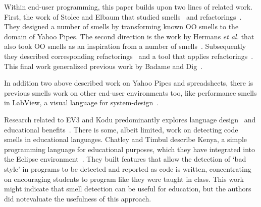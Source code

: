 \documentclass{sig-alternate}
\begin{document}
Within end-user programming, this paper builds upon two lines of related work. First, the work of Stolee and Elbaum that studied smells~\cite{StoleeTSE2013} and refactorings~\cite{Stolee2011}. They designed a number of smells by transforming known OO smells to the domain of Yahoo Pipes. The second direction is the work by Hermans \emph{et al.} that also took OO smells as an inspiration from a number of smells~\cite{Hermans2012intra, Hermans2012inter}. Subsequently they described corresponding refactorings~\cite{Hermans2012intraExt} and a tool that applies refactorings~\cite{hermans2014bumblebee}. This final work generalized previous work by Badame and Dig~\cite{badame2012refactoring}.


In addition two above described work on Yahoo Pipes and spreadsheets, there is previous smells work on other end-user environments too, like performance smells in LabView, a visual language for system-design~\cite{chambers2013smell, chambers2015impact}. 

Research related to  EV3 and Kodu predominantly explores 
language design~\cite{Fristoe:2011:SSE:2159365.2159396, Stolee:2011:ECS:1953163.1953197, MacLaurin:2009:KEP:1536513.1536516, MacLaurin:2011:DKT:1925844.1926413} 
and educational benefits~\cite{Fowler:2011:KGL:2159365.2159398, Touretzky:2013:AKC:2445196.2445374, Barnes:2002:TIJ:563340.563397, Hood:2005:TPL:1067445.1067454}. 
There is some, albeit limited, work on detecting code smells in educational languages. Chatley and Timbul describe Kenya, a simple programming language for educational purposes, which they have integrated into the Eclipse environment~\cite{Chatley2005}. They built features that allow the detection of `bad style' in programs to be detected and reported as code is written, concentrating on encouraging students to program like they were taught in class. This work might indicate that smell detection can be useful for education, but the authors  did notevaluate the usefulness of this approach.
\end{document}
